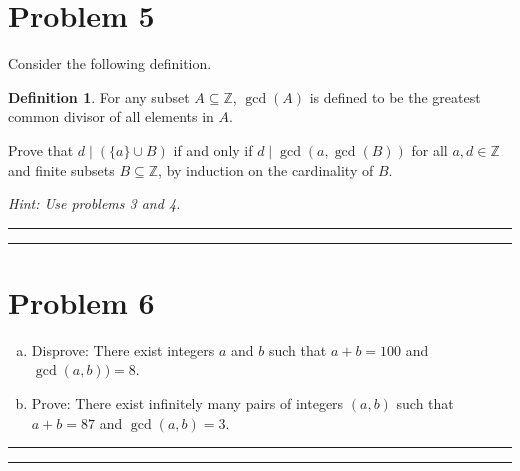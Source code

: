 \documentclass{article}
\theoremstyle{definition}
\newtheorem*{definition}{Definition} %
\newenvironment{solution}{\bigskip\hrule{\hfill}}{\bigskip\hrule{\hfill}} %
\begin{document}
\section*{Problem 5}
Consider the following definition.
\begin{definition}
    For any subset $A\subseteq\mathbb{Z}$, $\gcd\left(A\right)$ is defined to be the greatest common divisor of all elements in $A$.
\end{definition}
Prove that $d\mid\left(\{a\}\cup B\right)$ if and only if $d\mid\gcd\left(a,\gcd\left(B\right)\right)$ for all $a,d\in\mathbb{Z}$ and finite subsets $B\subseteq\mathbb{Z}$, by induction on the cardinality of $B$. \medskip

\emph{Hint: Use problems 3 and 4.}
\begin{solution}


\end{solution}


\newpage


\section*{Problem 6}
\begin{enumerate}[a)] %
    \item Disprove: There exist integers $a$ and $b$ such that $a+b=100$ and $\gcd\left(a,b\right))=8$.
    \item Prove: There exist infinitely many pairs of integers $\left(a,b\right)$ such that $a+b=87$ and $\gcd\left(a,b\right)=3$.
\end{enumerate}
\begin{solution}


\end{solution}


\newpage
\end{document}
